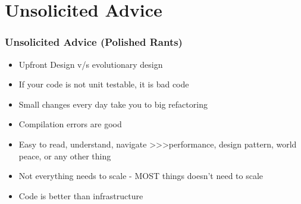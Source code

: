 \documentclass{beamer}
\begin{document}
\section{Unsolicited Advice}
\begin{frame}[fragile]
\frametitle{Unsolicited Advice (Polished Rants)}
\begin{itemize}
	\item Upfront Design v/s evolutionary design
	\pause
	\item If your code is not unit testable, it is bad code
	\pause
	\item Small changes every day take you to big refactoring
	\pause
	\item Compilation errors are good
	\pause
	\item Easy to read, understand, navigate \textgreater\textgreater\textgreater  performance, design pattern, world peace, or any other thing
	\pause
	\item Not everything needs to scale - MOST things doesn't need to scale
	\pause
	\item Code is better than infrastructure
\end{itemize}
\end{frame}

\section*{}
\end{document}

